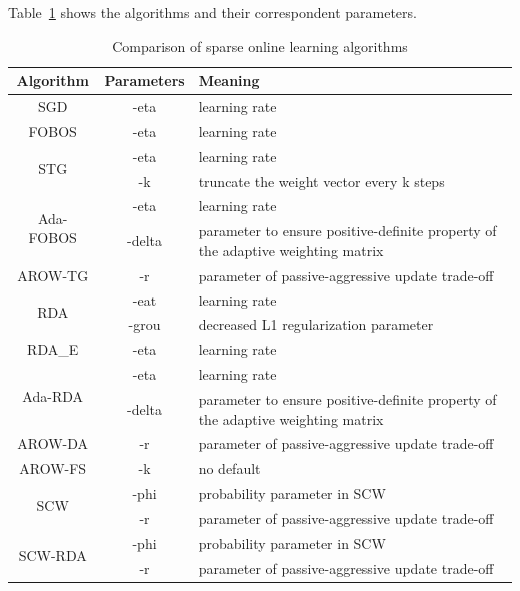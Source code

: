\documentclass[11pt,a4paper]{article}
\begin{document}
\begin{enumerate}
        Table~\ref{tbl:param_illustrate} shows the algorithms and their
        correspondent parameters.  
        \begin{table}[!ht]
            \renewcommand{\arraystretch}{1.3}
            \caption{Comparison of sparse online learning algorithms}
            \label{tbl:param_illustrate}
            \centering
            \begin{tabular}{|c|c|p{9cm}|}
                \hline
                Algorithm & Parameters & Meaning\\
                \hline
                SGD & -eta & learning rate \\
                \hline
                FOBOS & -eta & learning rate \\
                \hline
                \multirow{2}{*}{STG}& -eta & learning rate \\
                \cline{2-3}
                &-k & truncate the weight vector every k steps \\
                \hline
                \multirow{2}{*}{Ada-FOBOS}& -eta & learning rate \\
                \cline{2-3}
                & -delta & parameter to ensure positive-definite property of the adaptive weighting matrix \\
                \hline
                AROW-TG& -r &  parameter of passive-aggressive update trade-off\\
                \hline
                \multirow{2}{*}{RDA}&  -eat &  learning rate \\
                \cline{2-3}
                &-grou & decreased L1 regularization parameter \\
                \hline
                RDA\_E&  -eta & learning rate \\
                \hline
                \multirow{2}{*}{Ada-RDA}& -eta & learning rate \\
                \cline{2-3}
                & -delta & parameter to ensure positive-definite property of the adaptive weighting matrix \\
                \hline
                AROW-DA& -r  &parameter of passive-aggressive update trade-off\\
                \hline
                AROW-FS & -k & no default\\
                \hline
                \multirow{2}{*}{SCW}& -phi & probability parameter in SCW\\
                \cline{2-3}
                & -r & parameter of passive-aggressive update trade-off\\
                \hline
                \multirow{2}{*}{SCW-RDA}& -phi & probability parameter in SCW\\
                \cline{2-3}
                & -r & parameter of passive-aggressive update trade-off\\
                \hline
            \end{tabular}
        \end{table}
\end{enumerate}
\end{document}
